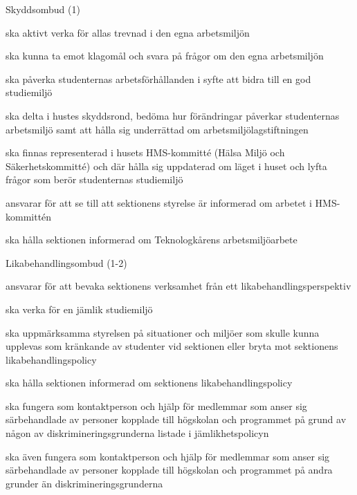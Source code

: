 \documentclass[10pt]{article}
\begin{document}
\begin{emptylist}
\begin{dashlist}
        \end{dashlist}
    \item Skyddsombud (1)
        \begin{dashlist}
            \item ska aktivt verka för allas trevnad i den egna arbetsmiljön
            \item ska kunna ta emot klagomål och svara på frågor om den egna arbetsmiljön
            \item ska påverka studenternas arbetsförhållanden i syfte att bidra till en god studiemiljö
            \item ska delta i hustes skyddsrond, bedöma hur förändringar påverkar studenternas arbetsmiljö samt att
hålla sig underrättad om arbetsmiljölagstiftningen
			\item ska finnas representerad i husets HMS-kommitté (Hälsa Miljö och Säkerhetskommitté) och där hålla
sig uppdaterad om läget i huset och lyfta frågor som berör studenternas studiemiljö
				\item ansvarar för att se till att sektionens styrelse är informerad om arbetet i HMS-kommittén
				\item ska hålla sektionen informerad om Teknologkårens arbetsmiljöarbete
        \end{dashlist}
    \item Likabehandlingsombud (1-2)
        \begin{dashlist}
            \item ansvarar för att bevaka sektionens verksamhet från ett likabehandlingsperspektiv
            \item ska verka för en jämlik studiemiljö
            \item ska uppmärksamma styrelsen på situationer och miljöer som skulle kunna upplevas som kränkande
av studenter vid sektionen eller bryta mot sektionens likabehandlingspolicy
			 \item ska hålla sektionen informerad om sektionens likabehandlingspolicy
			 \item ska fungera som kontaktperson och hjälp för medlemmar som anser sig särbehandlade av personer
kopplade till högskolan och programmet på grund av någon av diskrimineringsgrunderna listade i
jämlikhetspolicyn
			 \item ska även fungera som kontaktperson och hjälp för medlemmar som anser sig särbehandlade av
personer kopplade till högskolan och programmet på andra grunder än diskrimineringsgrunderna
        \end{dashlist}

\end{emptylist}
\end{document}
